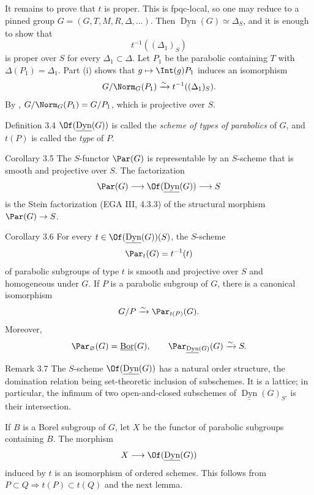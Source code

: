 It remains to prove that \(t\) is proper.  This is fpqc-local, so one may
reduce to a pinned group \(G=(G,T,M,R,\Delta,\ldots)\).  Then
\(\underline{\operatorname{Dyn}}(G)\simeq\Delta_S\), and it is enough to
show that
\[
 t^{-1}((\Delta_1)_S)
\]
is proper over \(S\) for every \(\Delta_1\subset\Delta\).  Let \(P_1\)
be the parabolic containing \(T\) with \(\Delta(P_1)=\Delta_1\).  Part
(i) shows that \(g\mapsto\Int(g)P_1\) induces an isomorphism
\[
 G/\Norm_G(P_1)\xrightarrow{\sim}t^{-1}((\Delta_1)_S).
\]
By , \(G/\Norm_G(P_1)=G/P_1\), which is projective over \(S\).

\begin{sgastatement}{Definition 3.4}
\(\Of(\underline{\operatorname{Dyn}}(G))\) is called the
\emph{scheme of types of parabolics} of \(G\), and \(t(P)\) is called
the \emph{type} of \(P\).
\end{sgastatement}

\begin{sgastatement}{Corollary 3.5}
The \(S\)-functor \(\Par(G)\) is representable by an \(S\)-scheme that is
smooth and projective over \(S\).  The factorization
\[
 \Par(G)\longrightarrow
 \Of(\underline{\operatorname{Dyn}}(G))
 \longrightarrow S
\]
is the Stein factorization \textup{(EGA III, 4.3.3)} of the structural
morphism \(\Par(G)\to S\).
\end{sgastatement}

\begin{sgastatement}{Corollary 3.6}
For every
\(t\in\Of(\underline{\operatorname{Dyn}}(G))(S)\), the \(S\)-scheme
\[
 \Par_t(G)=t^{-1}(t)
\]
of parabolic subgroups of type \(t\) is smooth and projective over \(S\)
and homogeneous under \(G\).  If \(P\) is a parabolic subgroup of \(G\),
there is a canonical isomorphism
\[
 G/P\xrightarrow{\sim}\Par_{t(P)}(G).
\]
Moreover,
\[
 \Par_{\varnothing}(G)=\underline{\operatorname{Bor}}(G),
 \qquad
 \Par_{\underline{\operatorname{Dyn}}(G)}(G)\xrightarrow{\sim}S.
\]
\end{sgastatement}

\begin{sgastatement}{Remark 3.7}
The \(S\)-scheme \(\Of(\underline{\operatorname{Dyn}}(G))\) has a natural
order structure, the domination relation being set-theoretic inclusion of
subschemes.  It is a lattice; in particular, the infimum of two
open-and-closed subschemes of
\(\underline{\operatorname{Dyn}}(G)_{S'}\) is their intersection.

If \(B\) is a Borel subgroup of \(G\), let \(X\) be the functor of
parabolic subgroups containing \(B\).  The morphism
\[
 X\longrightarrow\Of(\underline{\operatorname{Dyn}}(G))
\]
induced by \(t\) is an isomorphism of ordered schemes.  This follows from
\(P\subset Q\Rightarrow t(P)\subset t(Q)\) and the next lemma.
\end{sgastatement}

